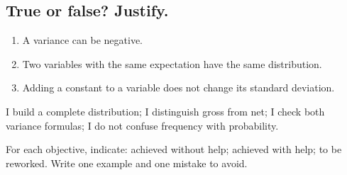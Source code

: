 \subsection*{True or false? Justify.}\label{C08-VF}
\begin{enumerate}
\item A variance can be negative.
\item Two variables with the same expectation have the same distribution.
\item Adding a constant to a variable does not change its standard deviation.
\end{enumerate}
\begin{keypoint}I build a complete distribution; I distinguish gross from net; I check both variance formulas; I do not confuse frequency with probability.

For each objective, indicate: achieved without help; achieved with help; to be reworked. Write one example and one mistake to avoid.\end{keypoint}
\endgroup
\ifmxteacher{}\fi
